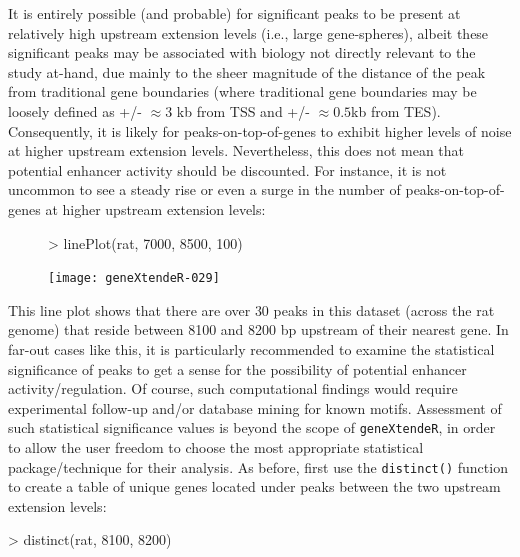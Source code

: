 \documentclass[12pt]{article}
\begin{document}
It is entirely possible (and probable) for significant peaks to be present at relatively high upstream extension levels (i.e., large gene-spheres), albeit these significant peaks may be associated with biology not directly relevant to the study at-hand, due mainly to the sheer magnitude of the distance of the peak from traditional gene boundaries (where traditional gene boundaries may be loosely defined as +/- $\approx 3$ kb from TSS and +/- $\approx 0.5$kb from TES).  Consequently, it is likely for peaks-on-top-of-genes to exhibit higher levels of noise at higher upstream extension levels.  Nevertheless, this does not mean that potential enhancer activity should be discounted.  For instance, it is not uncommon to see a steady rise or even a surge in the number of peaks-on-top-of-genes at higher upstream extension levels:

\begin{figure}[H]
\begin{center}
\begin{Schunk}
\begin{Sinput}
> linePlot(rat, 7000, 8500, 100)
\end{Sinput}
\end{Schunk}
\texttt{[image: geneXtendeR-029]}
\end{center}
\end{figure}

This line plot shows that there are over 30 peaks in this dataset (across the rat genome) that reside between 8100 and 8200 bp upstream of their nearest gene.  In far-out cases like this, it is particularly recommended to examine the statistical significance of peaks to get a sense for the possibility of potential enhancer activity/regulation.  Of course, such computational findings would require experimental follow-up and/or database mining for known motifs.  Assessment of such statistical significance values is beyond the scope of \texttt{geneXtendeR}, in order to allow the user freedom to choose the most appropriate statistical package/technique for their analysis.  As before, first use the \texttt{distinct()} function to create a table of unique genes located under peaks between the two upstream extension levels:

\begin{Schunk}
\begin{Sinput}
> distinct(rat, 8100, 8200)
\end{Sinput}
\end{Schunk}
\end{document}

